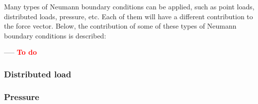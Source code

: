 Many types of Neumann boundary conditions can be applied, such as point loads, distributed loads, pressure, etc. Each of them will have a different contribution to the force vector. Below, the contribution of some of these types of Neumann boundary conditions is described:

----- \textbf{\textcolor{red}{To do}}

\subsubsection{Distributed load}

\subsubsection{Pressure}


